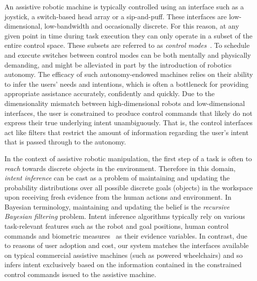 \documentclass[letterpaper, 10 pt, conference]{ieeeconf}  %
\begin{document}
An assistive robotic machine is typically controlled using an interface such as a joystick, a switch-based head array or a sip-and-puff. These interfaces are low-dimensional, low-bandwidth and occasionally discrete. For this reason, at any given point in time during task execution they can only operate in a subset of the entire control space. These subsets are referred to as \textit{control modes}~\cite{simpson2008tooth}. To schedule and execute switches between control modes can be both mentally and physically demanding, and might be alleviated in part by the introduction of robotics autonomy. The efficacy of such autonomy-endowed machines relies on their ability to infer the users' needs and intentions, which is often a bottleneck for providing appropriate assistance accurately, confidently and quickly. Due to the dimensionality mismatch between high-dimensional robots and low-dimensional interfaces, the user is constrained to produce control commands that likely do not express their true underlying intent unambiguously. That is, the control interfaces act like filters that restrict the amount of information regarding the user's intent that is passed through to the autonomy. 

In the context of assistive robotic manipulation, the first step of a task is often to \textit{reach} towards discrete objects in the environment. Therefore in this domain, \textit{intent inference} can be cast as a problem of maintaining and updating the probability distributions over all possible discrete goals (objects) in the workspace upon receiving fresh evidence from the human actions and environment. In Bayesian terminology, maintaining and updating the belief is the \textit{recursive Bayesian filtering} problem. Intent inference algorithms typically rely on various task-relevant features such as the robot and goal positions, human control commands and biometric measures~\cite{croft2003estimating} as their evidence variables. In contrast, due to reasons of user adoption and cost, our system matches the interfaces available on typical commercial assistive machines (such as powered wheelchairs) and so infers intent exclusively based on the information contained in the constrained control commands issued to the assistive machine. 
\end{document}
